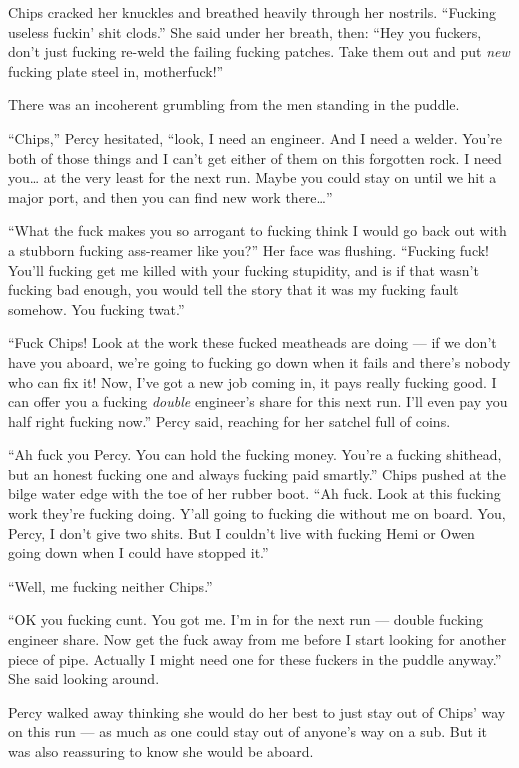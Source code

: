 \documentclass[]{scrbook}
\begin{document}
Chips cracked her knuckles and breathed heavily through her nostrils.
``Fucking useless fuckin' shit clods.'' She said under her breath, then:
``Hey you fuckers, don't just fucking re-weld the failing fucking
patches. Take them out and put \emph{new} fucking plate steel in,
motherfuck!''

There was an incoherent grumbling from the men standing in the puddle.

``Chips,'' Percy hesitated, ``look, I need an engineer. And I need a
welder. You're both of those things and I can't get either of them on
this forgotten rock. I need you\ldots{} at the very least for the next
run. Maybe you could stay on until we hit a major port, and then you can
find new work there\ldots{}''

``What the fuck makes you so arrogant to fucking think I would go back
out with a stubborn fucking ass-reamer like you?'' Her face was
flushing. ``Fucking fuck! You'll fucking get me killed with your fucking
stupidity, and is if that wasn't fucking bad enough, you would tell the
story that it was my fucking fault somehow. You fucking twat.''

``Fuck Chips! Look at the work these fucked meatheads are doing --- if
we don't have you aboard, we're going to fucking go down when it fails
and there's nobody who can fix it! Now, I've got a new job coming in, it
pays really fucking good. I can offer you a fucking \emph{double}
engineer's share for this next run. I'll even pay you half right fucking
now.'' Percy said, reaching for her satchel full of coins.

``Ah fuck you Percy. You can hold the fucking money. You're a fucking
shithead, but an honest fucking one and always fucking paid smartly.''
Chips pushed at the bilge water edge with the toe of her rubber boot.
``Ah fuck. Look at this fucking work they're fucking doing. Y'all going
to fucking die without me on board. You, Percy, I don't give two shits.
But I couldn't live with fucking Hemi or Owen going down when I could
have stopped it.''

``Well, me fucking neither Chips.''

``OK you fucking cunt. You got me. I'm in for the next run --- double
fucking engineer share. Now get the fuck away from me before I start
looking for another piece of pipe. Actually I might need one for these
fuckers in the puddle anyway.'' She said looking around.

Percy walked away thinking she would do her best to just stay out of
Chips' way on this run --- as much as one could stay out of anyone's way
on a sub. But it was also reassuring to know she would be aboard.
\end{document}
